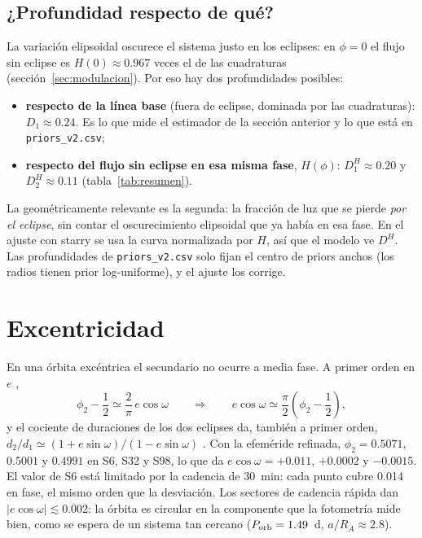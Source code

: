 \documentclass[11pt,a4paper]{article}
\newcommand{\porb}{P_{\rm orb}}
\begin{document}
\subsection{¿Profundidad respecto de qué?}
\label{sec:normalizacion}
La variación elipsoidal oscurece el sistema justo en los eclipses: en $\phi=0$ el flujo sin eclipse
es $H(0)\approx0.967$ veces el de las cuadraturas (sección~\ref{sec:modulacion}). Por eso hay dos
profundidades posibles:
\begin{itemize}
\item \textbf{respecto de la línea base} (fuera de eclipse, dominada por las cuadraturas):
  $D_1\approx0.24$. Es lo que mide el estimador de la sección anterior y lo que está en
  \texttt{priors\_v2.csv};
\item \textbf{respecto del flujo sin eclipse en esa misma fase}, $H(\phi)$: $D_1^{H}\approx0.20$
  y $D_2^{H}\approx0.11$ (tabla~\ref{tab:resumen}).
\end{itemize}
La geométricamente relevante es la segunda: la fracción de luz que se pierde \emph{por el
eclipse}, sin contar el oscurecimiento elipsoidal que ya había en esa fase. En el ajuste con starry
se usa la curva normalizada por $H$, así que el modelo ve $D^{H}$. Las profundidades de
\texttt{priors\_v2.csv} solo fijan el centro de priors anchos (los radios tienen prior log-uniforme),
y el ajuste los corrige.

\section{Excentricidad}
\label{sec:ecc}
En una órbita excéntrica el secundario no ocurre a media fase. A primer orden en $e$
\citep{Kopal1959,Winn2010},
\begin{equation}
\phi_2-\frac{1}{2}\simeq\frac{2}{\pi}\,e\cos\omega
\qquad\Longrightarrow\qquad
e\cos\omega\simeq\frac{\pi}{2}\left(\phi_2-\frac12\right),
\label{eq:ecosw}
\end{equation}
y el cociente de duraciones de los dos eclipses da, también a primer orden,
$d_2/d_1\simeq(1+e\sin\omega)/(1-e\sin\omega)$ \citep{Winn2010}. Con la efeméride refinada,
$\phi_2=0.5071$, $0.5001$ y $0.4991$ en S6, S32 y S98, lo que da $e\cos\omega=+0.011$, $+0.0002$ y
$-0.0015$. El valor de S6 está limitado por la cadencia de 30~min: cada punto cubre 0.014 en fase,
el mismo orden que la desviación. Los sectores de cadencia rápida dan $|e\cos\omega|\lesssim0.002$:
la órbita es circular en la componente que la fotometría mide bien, como se espera de un sistema
tan cercano ($\porb=1.49$~d, $a/R_A\approx2.8$).
\end{document}
